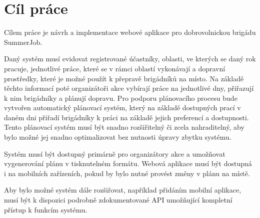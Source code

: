 \chapter{Cíl práce}

Cílem práce je návrh a implementace webové aplikace pro dobrovolnickou brigádu SummerJob. 

Daný systém musí evidovat registrované účastníky, oblasti, ve kterých se daný rok pracuje, jednotlivé práce, které se v rámci oblastí vykonávají a
dopravní prostředky, které je možné použít k přepravě brigádníků na místo. Na základě těchto informací poté organizátoři akce vybírají práce na
jednotlivé dny, přiřazují k nim brigádníky a plánují dopravu. Pro podporu plánovacího procesu bude vytvořen automatický plánovací systém,
který na základě dostupných prací v daném dni přiřadí brigádníky k práci na základě jejich preferencí a dostupnosti. Tento plánovací systém musí být snadno
rozšiřitelný či zcela nahraditelný, aby bylo možné jej snadno optimalizovat bez nutnosti úpravy zbytku systému.

Systém musí být dostupný primárně pro organizátory akce a umožňovat vygenerování plánu v tisknutelném formátu. Webová aplikace musí být dostupná
i na mobilních zařízeních, pokud by bylo nutné provést změny v plánu na místě.

Aby bylo možné systém dále rozšiřovat, například přidáním mobilní aplikace, musí být k dispozici podrobně zdokumentované API umožňující kompletní
přístup k funkcím systému.